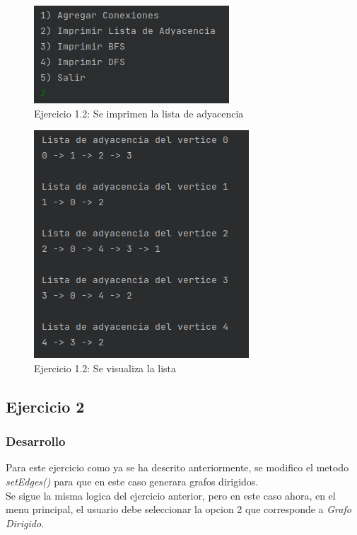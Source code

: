 \documentclass{article}
\begin{document}
			\begin{figure}[H]
				\centering
				\includegraphics[scale= 1]{images/e124.png}
				\caption*{Ejercicio 1.2: Se imprimen la lista de adyacencia}
			\end{figure}
		
			\begin{figure}[H]
				\centering
				\includegraphics[scale= 1]{images/e125.png}
				\caption*{Ejercicio 1.2: Se visualiza la lista}
			\end{figure}
		
		\newpage
			
		\subsection{Ejercicio 2}
		
			\subsubsection{Desarrollo}
			
				Para este ejercicio como ya se ha descrito anteriormente, se modifico el metodo \emph{setEdges()} para que en este caso generara grafos dirigidos.\\
				
				Se sigue la misma logica del ejercicio anterior, pero en este caso ahora, en el menu principal, el usuario debe seleccionar la opcion 2 que corresponde a \textit{Grafo Dirigido}.\\
				
\end{document}
